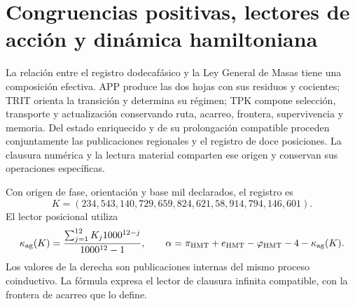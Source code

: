 \documentclass[a4paper,10pt]{article}
\theoremstyle{definition}\newtheorem{definition}[theorem]{Definición}
\theoremstyle{remark}\newtheorem{remark}[theorem]{Observación}
\numberwithin{equation}{section}
\begin{document}

\section{Congruencias positivas, lectores de acción y dinámica hamiltoniana}
\label{sec:k-mass-bridge}

La relación entre el registro dodecafásico y la Ley General de Masas tiene
una composición efectiva. APP produce las dos hojas con sus residuos y
cocientes; TRIT orienta la transición y determina su régimen; TPK compone
selección, transporte y actualización conservando ruta, acarreo, frontera,
supervivencia y memoria. Del estado enriquecido y de su prolongación
compatible proceden conjuntamente las publicaciones regionales y el
registro de doce posiciones. La clausura numérica y la lectura material
comparten ese origen y conservan sus operaciones específicas.

Con origen de fase, orientación y base mil declarados, el registro es
\[
 K=(234,543,140,729,659,824,621,58,914,794,146,601).
\]
El lector posicional utiliza
\begin{equation}
 \kappa_{\rm ag}(K)=\frac{\sum_{j=1}^{12}K_j1000^{12-j}}{1000^{12}-1},
 \qquad
 \alpha=\pi_{\rm HMT}+e_{\rm HMT}-\varphi_{\rm HMT}-4-
              \kappa_{\rm ag}(K).
 \label{eq:mass-k-alpha}
\end{equation}
Los valores de la derecha son publicaciones internas del mismo proceso
coinductivo. La fórmula expresa el lector de clausura infinita compatible,
con la frontera de acarreo que lo define.
\end{document}
